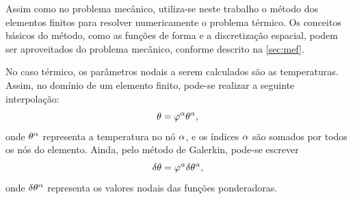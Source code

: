 \documentclass[Tese.tex]{subfiles}
\begin{document}
Assim como no problema mecânico, utiliza-se neste trabalho o método dos elementos finitos para resolver numericamente o problema térmico. Os conceitos básicos do método, como as funções de forma e a discretização espacial, podem ser aproveitados do problema mecânico, conforme descrito na \autoref{sec:mef}. 

No caso térmico, os parâmetros nodais a serem calculados são as temperaturas. Assim, no domínio de um elemento finito, pode-se realizar a seguinte interpolação:
\begin{equation}\label{eq:interp-temp}
\theta=\varphi^\alpha\theta^\alpha,
\end{equation}
onde $\theta^\alpha$ representa a temperatura no nó $\alpha$, e os índices $\alpha$ são somados por todos os nós do elemento. Ainda, pelo método de Galerkin, pode-se escrever
\begin{equation}\label{eq:interp-dtemp}
\delta\theta=\varphi^\alpha\delta\theta^\alpha,
\end{equation}
onde $\delta\theta^\alpha$ representa os valores nodais das funções ponderadoras.
\end{document}
